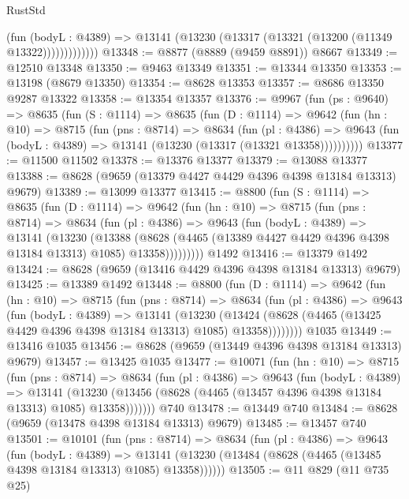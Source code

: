 \begin{lexlean}{RustStd}
\begin{coremodule}
                  (fun (bodyL : @4389) =>
                  @13141 (@13230 (@13317 (@13321 (@13200 (@11349 @13322)))))))))))))
@13348 := @8877 (@8889 (@9459 @8891)) @8667
@13349 := @12510 @13348
@13350 := @9463 @13349
@13351 := @13344 @13350
@13353 := @13198 (@8679 @13350)
@13354 := @8628 @13353
@13357 := @8686 @13350 @9287 @13322
@13358 := @13354 @13357
@13376 := @9967
    (fun (ps : @9640) =>
    @8635
      (fun (S : @1114) =>
      @8635
        (fun (D : @1114) =>
        @9642
          (fun (hn : @10) =>
          @8715
            (fun (pns : @8714) =>
            @8634
              (fun (pl : @4386) =>
              @9643 (fun (bodyL : @4389) => @13141 (@13230 (@13317 (@13321 @13358))))))))))
@13377 := @11500 @11502
@13378 := @13376 @13377
@13379 := @13088 @13377
@13388 := @8628 (@9659 (@13379 @4427 @4429 @4396 @4398 @13184 @13313) @9679)
@13389 := @13099 @13377
@13415 := @8800
    (fun (S : @1114) =>
    @8635
      (fun (D : @1114) =>
      @9642
        (fun (hn : @10) =>
        @8715
          (fun (pns : @8714) =>
          @8634
            (fun (pl : @4386) =>
            @9643
              (fun (bodyL : @4389) =>
              @13141
                (@13230
                  (@13388
                    (@8628
                      (@4465 (@13389 @4427 @4429 @4396 @4398 @13184 @13313) @1085)
                      @13358)))))))))
    @1492
@13416 := @13379 @1492
@13424 := @8628 (@9659 (@13416 @4429 @4396 @4398 @13184 @13313) @9679)
@13425 := @13389 @1492
@13448 := @8800
    (fun (D : @1114) =>
    @9642
      (fun (hn : @10) =>
      @8715
        (fun (pns : @8714) =>
        @8634
          (fun (pl : @4386) =>
          @9643
            (fun (bodyL : @4389) =>
            @13141
              (@13230
                (@13424 (@8628 (@4465 (@13425 @4429 @4396 @4398 @13184 @13313) @1085) @13358))))))))
    @1035
@13449 := @13416 @1035
@13456 := @8628 (@9659 (@13449 @4396 @4398 @13184 @13313) @9679)
@13457 := @13425 @1035
@13477 := @10071
    (fun (hn : @10) =>
    @8715
      (fun (pns : @8714) =>
      @8634
        (fun (pl : @4386) =>
        @9643
          (fun (bodyL : @4389) =>
          @13141
            (@13230 (@13456 (@8628 (@4465 (@13457 @4396 @4398 @13184 @13313) @1085) @13358)))))))
    @740
@13478 := @13449 @740
@13484 := @8628 (@9659 (@13478 @4398 @13184 @13313) @9679)
@13485 := @13457 @740
@13501 := @10101
    (fun (pns : @8714) =>
    @8634
      (fun (pl : @4386) =>
      @9643
        (fun (bodyL : @4389) =>
        @13141 (@13230 (@13484 (@8628 (@4465 (@13485 @4398 @13184 @13313) @1085) @13358))))))
@13505 := @11 @829 (@11 @735 @25)

\end{coremodule}
\end{lexlean}
